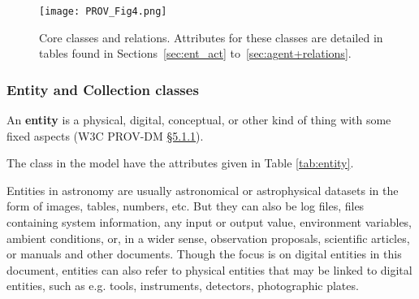 \begin{figure}[ht]
\centering
\texttt{[image: PROV\_Fig4.png]}
\caption[Core classes and relations]{Core classes and relations. Attributes for these classes are detailed in tables found in Sections~\ref{sec:ent_act} to~\ref{sec:agent+relations}.}
\label{fig:coreclasses}
\end{figure}



\subsubsection{Entity and Collection classes}
\label{sec:Entity}

An \textbf{entity} is a physical, digital, conceptual, or other kind of thing with some fixed aspects (W3C PROV-DM \href{https://www.w3.org/TR/prov-dm/#term-entity}{\S5.1.1}). 

The  class in the model have the attributes given in Table \ref{tab:entity}. 

Entities in astronomy are usually astronomical or astrophysical datasets in the form of images, tables, numbers, etc. But they can also be log files, files containing system information, any input or output value, environment variables, ambient conditions, or, in a wider sense, observation proposals, scientific articles, or manuals and other documents. 
Though the focus is on digital entities in this document, entities can also refer to physical entities that may be linked to digital entities, such as e.g. tools, instruments, detectors, photographic plates.


